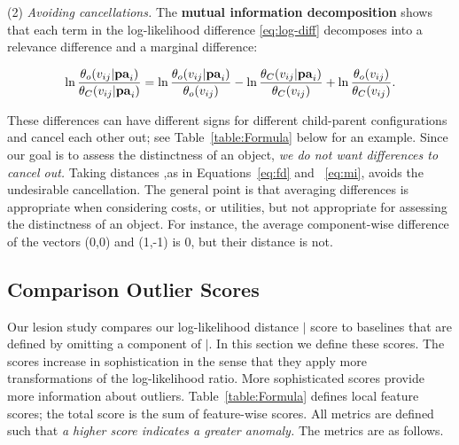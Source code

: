 	\noindent
	(2) {\em Avoiding cancellations.} The \textbf{mutual information decomposition} shows that each term in the log-likelihood difference \eqref{eq:log-diff} decomposes into a relevance difference and a marginal difference: 
	
	\begin{equation} \label{eq:decompose}
	\ln \frac{\theta_{o}( v_{ij}|\mathbf{pa}_{i})}{\theta_{C}( v_{ij}|\mathbf{pa}_{i})} = \ln \frac{\theta_{o}(v_{ij}|\mathbf{pa}_{i})}{\theta_{o}(v_{ij})} - \ln \frac{\theta_{C}( v_{ij}|\mathbf{pa}_{i})}{\theta_{C}(v_{ij})} + \ln \frac{\theta_{o}( v_{ij})}{\theta_{C}( v_{ij})}.
	\end{equation}
	
	These differences can have different signs for different child-parent configurations and cancel each other out; see Table~\ref{table:Formula} below for an example.  Since our goal is to assess the distinctness of an object, {\em we do not want differences to cancel out.} Taking distances ,as in Equations~\eqref{eq:fd} and ~\eqref{eq:mi}, avoids the undesirable cancellation. The general point is that averaging differences is appropriate when considering costs, or utilities, but not appropriate for assessing the distinctness of an object. For instance, the average component-wise difference of the vectors (0,0) and (1,-1) is 0, but their distance is not.
	
	
		\subsection{Comparison Outlier Scores} \label{sec:comparison} Our lesion study compares our log-likelihood distance  $\mid$ score to baselines that are defined by omitting a component of $\mid$. In this section we define these scores.
		The scores increase in sophistication in the sense that they apply more transformations of the log-likelihood ratio. 
		More sophisticated scores provide more information about outliers.   
		Table~\ref{table:Formula} defines local feature scores; the total score is the sum of feature-wise scores. All metrics are defined such that {\em a higher score indicates a greater anomaly.} The metrics are as follows. 
		
